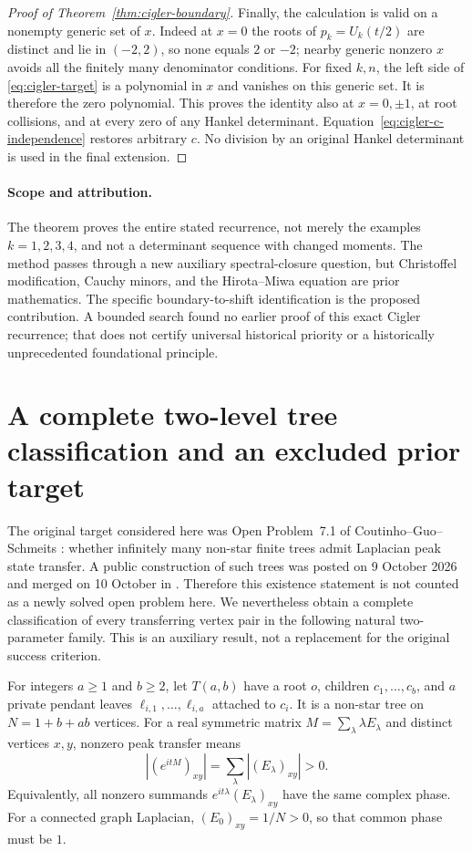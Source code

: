 \documentclass[11pt,a4paper]{article}
\theoremstyle{definition}\newtheorem{definition}[theorem]{Definition}
\theoremstyle{remark}\newtheorem{remark}[theorem]{Remark}
\begin{document}
\begin{proof}[Proof of Theorem~\ref{thm:cigler-boundary}]
Finally, the calculation is valid on a nonempty generic set of $x$.
Indeed at $x=0$ the roots of $p_k=U_k(t/2)$ are distinct and lie in
$(-2,2)$, so none equals $2$ or $-2$; nearby generic nonzero $x$ avoids
all the finitely many denominator conditions. For fixed $k,n$, the left
side of \eqref{eq:cigler-target} is a polynomial in $x$ and vanishes on
this generic set. It is therefore the zero polynomial. This proves the
identity also at $x=0,\pm1$, at root collisions, and at every zero of any
Hankel determinant. Equation~\eqref{eq:cigler-c-independence} restores
arbitrary $c$. No division by an original Hankel determinant is used in
the final extension.
\end{proof}

\paragraph{Scope and attribution.}
The theorem proves the entire stated recurrence, not merely the examples
$k=1,2,3,4$, and not a determinant sequence with changed moments.
The method passes through a new auxiliary spectral-closure question,
but Christoffel modification, Cauchy minors, and the Hirota--Miwa equation
are prior mathematics. The specific boundary-to-shift identification is
the proposed contribution. A bounded search found no earlier proof of
this exact Cigler recurrence; that does not certify universal historical
priority or a historically unprecedented foundational principle.

\section{A complete two-level tree classification and an excluded prior target}
\label{sec:two-level-trees}

The original target considered here was Open Problem~7.1 of
Coutinho--Guo--Schmeits \cite{CGS25}: whether infinitely many non-star
finite trees admit Laplacian peak state transfer. A public construction
of such trees was posted on 9 October 2026 and merged on 10 October in
\cite{PriorTree26}. Therefore this existence statement is not counted as
a newly solved open problem here. We nevertheless obtain a complete
classification of every transferring vertex pair in the following
natural two-parameter family. This is an auxiliary result, not a
replacement for the original success criterion.

For integers $a\geq1$ and $b\geq2$, let $T(a,b)$ have a root $o$, children
$c_1,\ldots,c_b$, and $a$ private pendant leaves $\ell_{i,1},\ldots,
\ell_{i,a}$ attached to $c_i$. It is a non-star tree on
$N=1+b+ab$ vertices. For a real symmetric matrix $M=\sum_\lambda
\lambda E_\lambda$ and distinct vertices $x,y$, nonzero peak transfer
means
\[
 |(e^{itM})_{xy}|=\sum_\lambda |(E_\lambda)_{xy}|>0.
\]
Equivalently, all nonzero summands $e^{it\lambda}(E_\lambda)_{xy}$
have the same complex phase. For a connected graph Laplacian,
$(E_0)_{xy}=1/N>0$, so that common phase must be $1$.
\end{document}

